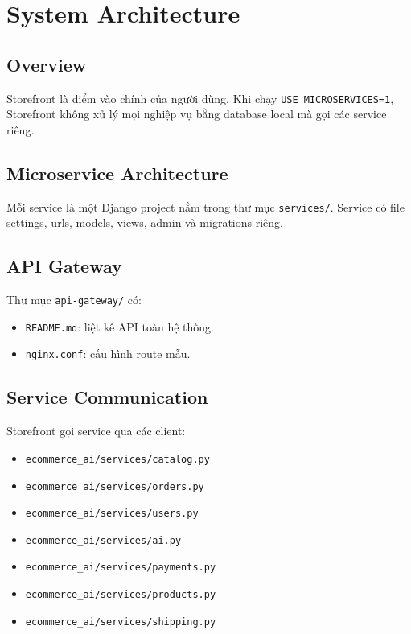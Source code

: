 \documentclass[12pt,a4paper]{report}
\begin{document}
\section{System Architecture}

\subsection{Overview}

Storefront là điểm vào chính của người dùng. Khi chạy \texttt{USE\_MICROSERVICES=1}, Storefront không xử lý mọi nghiệp vụ bằng database local mà gọi các service riêng.

\subsection{Microservice Architecture}

Mỗi service là một Django project nằm trong thư mục \texttt{services/}. Service có file settings, urls, models, views, admin và migrations riêng.

\subsection{API Gateway}

Thư mục \texttt{api-gateway/} có:

\begin{itemize}
  \item \texttt{README.md}: liệt kê API toàn hệ thống.
  \item \texttt{nginx.conf}: cấu hình route mẫu.
\end{itemize}

\subsection{Service Communication}

Storefront gọi service qua các client:

\begin{itemize}
  \item \texttt{ecommerce\_ai/services/catalog.py}
  \item \texttt{ecommerce\_ai/services/orders.py}
  \item \texttt{ecommerce\_ai/services/users.py}
  \item \texttt{ecommerce\_ai/services/ai.py}
  \item \texttt{ecommerce\_ai/services/payments.py}
  \item \texttt{ecommerce\_ai/services/products.py}
  \item \texttt{ecommerce\_ai/services/shipping.py}
\end{itemize}
\end{document}
